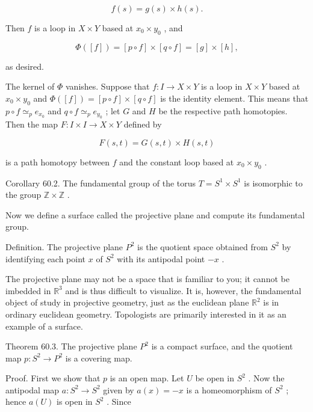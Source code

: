 \documentclass[10pt]{article}
\begin{document}
\[
f\left( s\right)  = g\left( s\right)  \times  h\left( s\right) .
\]

Then \(f\) is a loop in \(X \times  Y\) based at \({x}_{0} \times  {y}_{0}\) , and

\[
\Phi \left( \left\lbrack  f\right\rbrack  \right)  = \left\lbrack  {p \circ  f}\right\rbrack   \times  \left\lbrack  {q \circ  f}\right\rbrack   = \left\lbrack  g\right\rbrack   \times  \left\lbrack  h\right\rbrack  ,
\]

as desired.

The kernel of \(\Phi\) vanishes. Suppose that \(f : I \rightarrow  X \times  Y\) is a loop in \(X \times  Y\) based at \({x}_{0} \times  {y}_{0}\) and \(\Phi \left( \left\lbrack  f\right\rbrack  \right)  = \left\lbrack  {p \circ  f}\right\rbrack   \times  \left\lbrack  {q \circ  f}\right\rbrack\) is the identity element. This means that \(p \circ  f{ \simeq  }_{p}{e}_{{x}_{0}}\) and \(q \circ  f{ \simeq  }_{p}{e}_{{y}_{0}}\) ; let \(G\) and \(H\) be the respective path homotopies. Then the map \(F : I \times  I \rightarrow  X \times  Y\) defined by

\[
F\left( {s,t}\right)  = G\left( {s,t}\right)  \times  H\left( {s,t}\right)
\]

is a path homotopy between \(f\) and the constant loop based at \({x}_{0} \times  {y}_{0}\) .

Corollary 60.2. The fundamental group of the torus \(T = {S}^{1} \times  {S}^{1}\) is isomorphic to the group \(\mathbb{Z} \times  \mathbb{Z}\) .

Now we define a surface called the projective plane and compute its fundamental group.

Definition. The projective plane \({P}^{2}\) is the quotient space obtained from \({S}^{2}\) by identifying each point \(x\) of \({S}^{2}\) with its antipodal point \(- x\) .

The projective plane may not be a space that is familiar to you; it cannot be imbedded in \({\mathbb{R}}^{3}\) and is thus difficult to visualize. It is, however, the fundamental object of study in projective geometry, just as the euclidean plane \({\mathbb{R}}^{2}\) is in ordinary euclidean geometry. Topologists are primarily interested in it as an example of a surface.

Theorem 60.3. The projective plane \({P}^{2}\) is a compact surface, and the quotient map \(p : {S}^{2} \rightarrow  {P}^{2}\) is a covering map.

Proof. First we show that \(p\) is an open map. Let \(U\) be open in \({S}^{2}\) . Now the antipodal map \(a : {S}^{2} \rightarrow  {S}^{2}\) given by \(a\left( x\right)  =  - x\) is a homeomorphism of \({S}^{2}\) ; hence \(a\left( U\right)\) is open in \({S}^{2}\) . Since
\end{document}
